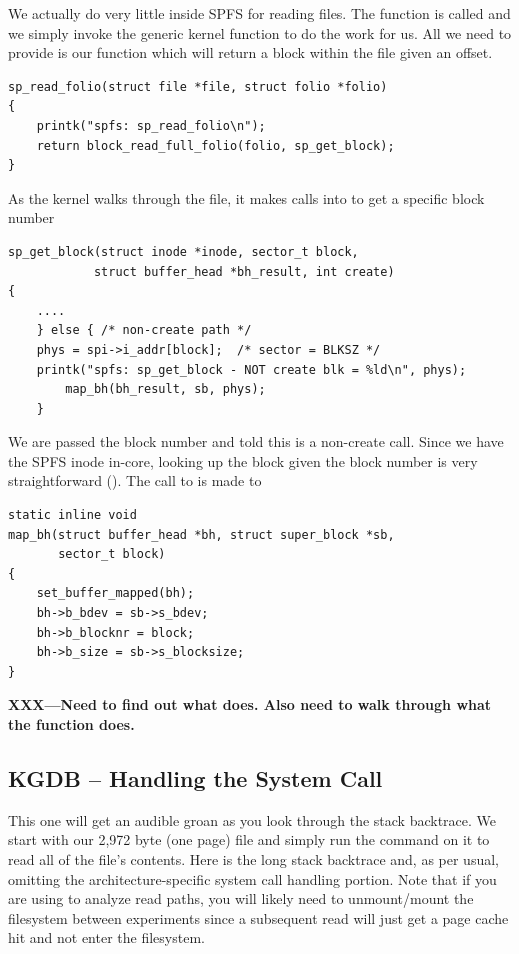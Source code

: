 \noindent
We actually do very little inside SPFS for reading files. The  function is called and we simply invoke the generic kernel  function to do the work for us. All we need to provide is our  function which will return a block within the file given an offset.

\begin{lstlisting}
sp_read_folio(struct file *file, struct folio *folio)
{
    printk("spfs: sp_read_folio\n");
    return block_read_full_folio(folio, sp_get_block);
}
\end{lstlisting}

\noindent
As the kernel walks through the file, it makes calls into  to get a specific block number

\begin{lstlisting}
sp_get_block(struct inode *inode, sector_t block, 
            struct buffer_head *bh_result, int create)
{  
    ....
    } else { /* non-create path */
    phys = spi->i_addr[block];  /* sector = BLKSZ */
    printk("spfs: sp_get_block - NOT create blk = %ld\n", phys);
        map_bh(bh_result, sb, phys);
    }
\end{lstlisting}

\noindent
We are passed the block number and told this is a non-create call. Since we have the SPFS inode in-core, looking up the block given the block number is very straightforward (). The call to  is made to 

\begin{lstlisting}
static inline void
map_bh(struct buffer_head *bh, struct super_block *sb, 
       sector_t block)
{
	set_buffer_mapped(bh);
	bh->b_bdev = sb->s_bdev;
	bh->b_blocknr = block;
	bh->b_size = sb->s_blocksize;
}
\end{lstlisting}

\noindent
{\bfseries XXX---Need to find out what  does. Also need to walk through what the function  does.}


\subsection{KGDB -- Handling the  System Call}

This one will get an audible groan as you look through the stack backtrace. We start with our 2,972 byte (one page) file  and simply run the  command on it to read all of the file's contents. Here is the long stack backtrace and, as per usual, omitting the architecture-specific system call handling portion. Note that if you are using  to analyze read paths, you will likely need to unmount/mount the filesystem between experiments since a subsequent read will just get a page cache hit and not enter the filesystem.

